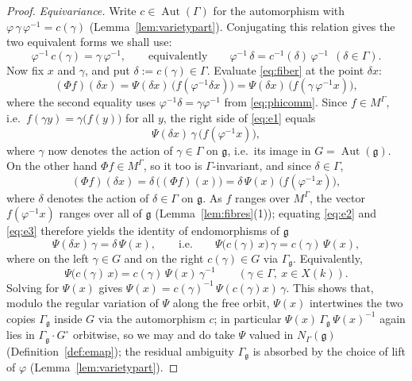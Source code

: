\documentclass{amsart}
\theoremstyle{definition}
\DeclareMathOperator{\Aut}{Aut}
\newcommand{\g}{\mathfrak{g}}
\newcommand{\M}{M}
\begin{document}
\begin{proof}
\emph{Equivariance.}  Write $c\in\Aut(\Gamma)$ for the automorphism with
$\varphi\,\gamma\,\varphi^{-1}=c(\gamma)$ (Lemma~\ref{lem:varietypart}).
Conjugating this relation gives the two equivalent forms we shall use:
\begin{equation}\label{eq:phicomm}
\varphi^{-1}\,c(\gamma)=\gamma\,\varphi^{-1},
\qquad\text{equivalently}\qquad
\varphi^{-1}\,\delta=c^{-1}(\delta)\,\varphi^{-1}\ \ (\delta\in\Gamma).
\end{equation}
Now fix $x$ and $\gamma$, and put $\delta:=c(\gamma)\in\Gamma$.  Evaluate
\eqref{eq:fiber} at the point $\delta x$:
\begin{equation}\label{eq:e1}
(\Phi f)(\delta x)=\Psi(\delta x)\,\bigl(f(\varphi^{-1}\delta x)\bigr)
=\Psi(\delta x)\,\bigl(f(\gamma\,\varphi^{-1}x)\bigr),
\end{equation}
where the second equality uses $\varphi^{-1}\delta=\gamma\varphi^{-1}$ from
\eqref{eq:phicomm}.  Since $f\in\M^\Gamma$, i.e.\ $f(\gamma y)=
\gamma\bigl(f(y)\bigr)$ for all $y$, the right side of \eqref{eq:e1}
equals
\begin{equation}\label{eq:e2}
\Psi(\delta x)\,\gamma\,\bigl(f(\varphi^{-1}x)\bigr),
\end{equation}
where $\gamma$ now denotes the action of $\gamma\in\Gamma$ on $\g$, i.e.\
its image in $G=\Aut(\g)$.  On the other hand $\Phi f\in\M^\Gamma$, so it
too is $\Gamma$-invariant, and since $\delta\in\Gamma$,
\begin{equation}\label{eq:e3}
(\Phi f)(\delta x)=\delta\,\bigl((\Phi f)(x)\bigr)
=\delta\,\Psi(x)\,\bigl(f(\varphi^{-1}x)\bigr),
\end{equation}
where $\delta$ denotes the action of $\delta\in\Gamma$ on $\g$.  As $f$
ranges over $\M^\Gamma$, the vector $f(\varphi^{-1}x)$ ranges over all of
$\g$ (Lemma~\ref{lem:fibres}(1)); equating \eqref{eq:e2} and \eqref{eq:e3}
therefore yields the identity of endomorphisms of $\g$
\[
\Psi(\delta x)\,\gamma=\delta\,\Psi(x),
\qquad\text{i.e.}\qquad
\Psi\bigl(c(\gamma)\,x\bigr)\,\gamma=c(\gamma)\,\Psi(x),
\]
where on the left $\gamma\in G$ and on the right $c(\gamma)\in G$ via
$\Gamma_\g$.  Equivalently,
\begin{equation}\label{eq:equiv}
\Psi\bigl(c(\gamma)\,x\bigr)=c(\gamma)\,\Psi(x)\,\gamma^{-1}\qquad
(\gamma\in\Gamma,\ x\in X(k)).
\end{equation}
Solving for $\Psi(x)$ gives $\Psi(x)=c(\gamma)^{-1}\,\Psi(c(\gamma)x)\,
\gamma$.  This shows that, modulo the regular variation of $\Psi$ along the
free orbit, $\Psi(x)$ intertwines the two copies $\Gamma_\g$ inside $G$ via
the automorphism $c$; in particular $\Psi(x)\,\Gamma_\g\,\Psi(x)^{-1}$
again lies in $\Gamma_\g\cdot G^\circ$ orbitwise, so we may and do take
$\Psi$ valued in $N_\Gamma(\g)$ (Definition~\ref{def:emap}); the residual
ambiguity $\Gamma_\g$ is absorbed by the choice of lift of $\varphi$
(Lemma~\ref{lem:varietypart}).
\end{proof}
\end{document}
